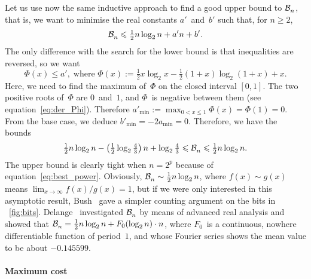 Let us use now the same inductive approach to find a good upper bound
to \(\mathcal{B}_{n}^{}\), that is, we want to minimise the real constants
\(a'\)~and~\(b'\) such that, for \(n \geqslant 2\),
\begin{equation*}
\mathcal{B}_{n}^{} \leqslant \tfrac{1}{2}n\log_2 n + a'n + b'.
\end{equation*}
The only difference with the search for the lower bound is that
inequalities are reversed, so we want
\begin{equation*}
\Phi(x) \leqslant a', \;\text{where \(\Phi(x) := \tfrac{1}{2}x\log_2 x - \tfrac{1}{2}(1+x)\log_2(1+x) + x\)}.
\end{equation*}
Here, we need to find the maximum of~\(\Phi\) on the closed interval
\([0,1]\). The two positive roots of~\(\Phi\) are \(0\)~and~\(1\), and
\(\Phi\)~is negative between them (see
equation~\eqref{eq:der_Phi}). Therefore \(a'_{\min} := \max_{0 < x
  \leqslant 1}\Phi(x) = \Phi(1) = 0\). From the base case, we deduce
\(b'_{\min} = -2a_{\min} = 0\). Therefore, we have the bounds
\begin{equation}
\tfrac{1}{2}n\log_2 n - \left(\tfrac{1}{2}\log_2\tfrac{4}{3}\right)n + \log_2\tfrac{4}{3}
\leqslant \mathcal{B}_{n}^{} \leqslant
\tfrac{1}{2}n\log_2 n.
\label{ineq:bounds_Btms}
\end{equation}
The upper bound is clearly tight when \(n=2^p\) because of
equation~\eqref{eq:best_power}. Obviously, \(\mathcal{B}_{n}^{} \sim
\frac{1}{2}n\log_2 n\), where \(f(x) \sim g(x)\) means \(\lim_{x\to
  \infty}f(x)/g(x) = 1\), but if we were only interested in this
asymptotic result, Bush~\cite{Bush:1940} gave a simpler counting
argument on the bits in \fig~\ref{fig:bits}.
Delange~\cite{Delange:1975} investigated \(\mathcal{B}_{n}^{}\) by means of
advanced real analysis and showed that \(\mathcal{B}_{n}^{} = \tfrac{1}{2}n\log_2
n + F_0(\log_2 n) \cdot n\), where \(F_0\)~is a continuous, nowhere
differentiable function of period~\(1\), and whose Fourier series
shows the mean value to be about \(-0.145599\).

\paragraph{Maximum cost}

